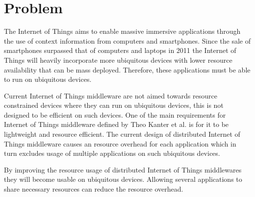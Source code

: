 \section{Problem}
\label{problem}
The Internet of Things aims to enable massive immersive applications through the use of context information from computers and smartphones. Since the sale of smartphones surpassed that of computers and laptops in 2011 \cite{canalsys} the Internet of Things will heavily incorporate more ubiquitous devices with lower resource availability that can be mass deployed. Therefore, these applications must be able to run on ubiquitous devices.

Current Internet of Things middleware are not aimed towards resource constrained devices where they can run on ubiquitous devices, this is not designed to be efficient on such devices. One of the main requirements for Internet of Things middleware defined by Theo Kanter et al. \cite{Kanter539187} is for it to be lightweight and resource efficient. The current design of distributed Internet of Things middleware causes an resource overhead for each application which in turn excludes usage of multiple applications on such ubiquitous devices. 

By improving the resource usage of distributed Internet of Things middlewares they will become usable on ubiquitous devices. Allowing several applications to share necessary resources can reduce the resource overhead. 


